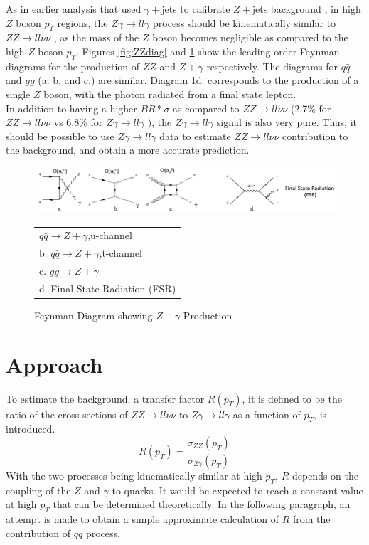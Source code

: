 \documentclass[11pt,a4paper,final]{report}
\newcommand{\ZZ}{$ZZ\to ll\nu\nu$ }
\newcommand{\Zgam}{$Z\gamma\to ll\gamma$ }
\begin{document}
As in earlier analysis that used $\gamma+$jets to calibrate $Z+$jets background \cite{gammajet}, in high $Z$ boson $p_T$ regions, the \Zgam process should be kinematically similar to \ZZ, as the mass of the $Z$ boson becomes negligible as compared to the high $Z$ boson $p_T$. Figures \ref{fig:ZZdiag} and \ref{fig:Zgdiag} show the leading order Feynman diagrams for the production of $ZZ$ and $Z+\gamma$ respectively. The diagrams for $q\bar{q}$ and $gg$ (a. b. and c.) are similar. Diagram \ref{fig:Zgdiag}d. corresponds to the production of a single $Z$ boson, with the photon radiated from a final state lepton.\\
In addition to having a higher $BR*\sigma$ as compared to \ZZ (2.7\% for \ZZ vs 6.8\% for \Zgam), the \Zgam signal is also very pure. Thus, it should be possible to use \Zgam data to estimate \ZZ contribution to the background, and obtain a more accurate prediction.
\begin{figure}[h]
	\begin{center}
		\includegraphics[width=\linewidth]{Zg.png}
		\captionsetup{justification=centering}
		\caption{Feynman Diagram showing $Z+\gamma$ Production} 
		\begin{tabular}{l}
		$q\bar{q}\rightarrow Z+\gamma$,u-channel\\ 
		b. $q\bar{q}\rightarrow Z+\gamma$,t-channel\\ 
		c. $gg\rightarrow Z+\gamma$ \\ 
		d. Final State Radiation (FSR)
		\end{tabular}
		\label{fig:Zgdiag}
	\end{center}
\end{figure}
\section{Approach}
To estimate the background, a transfer factor $R(p_T)$, it is defined to be the ratio of the cross sections of \ZZ to \Zgam as a function of $p_T$, is introduced.
\begin{equation}
	R(p_{T}) = \frac{\sigma_{ZZ}(p_{T})}{\sigma_{Z\gamma}(p_T)}
\end{equation}
With the two processes being kinematically similar at high $p_T$, $R$ depends on the coupling of the $Z$ and $\gamma$ to quarks. It would be expected to reach a constant value at high $p_T$ that can be determined theoretically. In the following paragraph, an attempt is made to obtain a simple approximate calculation of $R$ from the contribution of $qq$ process.
\end{document}
